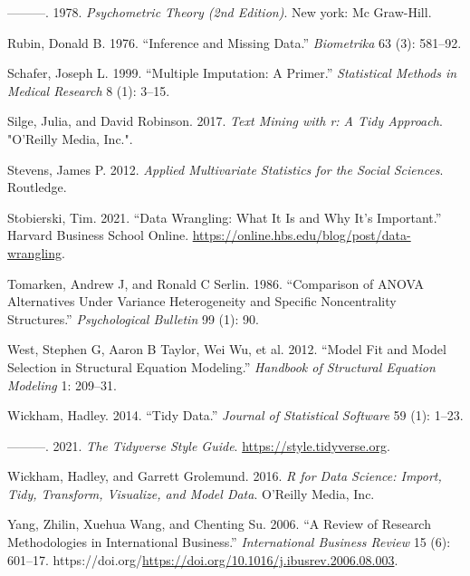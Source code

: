 \documentclass[
  letterpaper,
]{krantz}
\newlength{\cslhangindent}
\newenvironment{CSLReferences}[2] %
 {\begin{list}{}{%
  \setlength{\itemindent}{0pt}
  \setlength{\leftmargin}{0pt}
  \setlength{\parsep}{0pt}
  \ifodd #1
   \setlength{\leftmargin}{\cslhangindent}
   \setlength{\itemindent}{-1\cslhangindent}
  \fi
  \setlength{\itemsep}{#2\baselineskip}}}
 {\end{list}}
\begin{document}
\begin{CSLReferences}{1}{0}
---------. 1978. \emph{Psychometric Theory (2nd Edition)}. New york: Mc
Graw-Hill.

Rubin, Donald B. 1976. {``Inference and Missing Data.''}
\emph{Biometrika} 63 (3): 581--92.

Schafer, Joseph L. 1999. {``Multiple Imputation: A Primer.''}
\emph{Statistical Methods in Medical Research} 8 (1): 3--15.

Silge, Julia, and David Robinson. 2017. \emph{Text Mining with r: A Tidy
Approach}. "O'Reilly Media, Inc.".

Stevens, James P. 2012. \emph{Applied Multivariate Statistics for the
Social Sciences}. Routledge.

Stobierski, Tim. 2021. {``Data Wrangling: What It Is and Why It's
Important.''} Harvard Business School Online.
\url{https://online.hbs.edu/blog/post/data-wrangling}.

Tomarken, Andrew J, and Ronald C Serlin. 1986. {``Comparison of ANOVA
Alternatives Under Variance Heterogeneity and Specific Noncentrality
Structures.''} \emph{Psychological Bulletin} 99 (1): 90.

West, Stephen G, Aaron B Taylor, Wei Wu, et al. 2012. {``Model Fit and
Model Selection in Structural Equation Modeling.''} \emph{Handbook of
Structural Equation Modeling} 1: 209--31.

Wickham, Hadley. 2014. {``Tidy Data.''} \emph{Journal of Statistical
Software} 59 (1): 1--23.

---------. 2021. \emph{The Tidyverse Style Guide}.
\url{https://style.tidyverse.org}.

Wickham, Hadley, and Garrett Grolemund. 2016. \emph{R for Data Science:
Import, Tidy, Transform, Visualize, and Model Data}. {O'Reilly Media,
Inc.}

Yang, Zhilin, Xuehua Wang, and Chenting Su. 2006. {``A Review of
Research Methodologies in International Business.''} \emph{International
Business Review} 15 (6): 601--17.
https://doi.org/\url{https://doi.org/10.1016/j.ibusrev.2006.08.003}.

\end{CSLReferences}



\backmatter
\printindex
\end{document}
